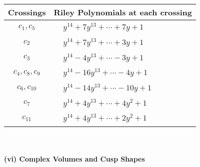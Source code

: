 \documentclass[1p]{elsarticle_modified}
\theoremstyle{definition}
\begin{document}
\begin{tabular}{m{50pt}|m{274pt}}
Crossings & \hspace{64pt}Riley Polynomials at each crossing \\
\hline $$\begin{aligned}c_{1},c_{5}\end{aligned}$$&$\begin{aligned}
&y^{14}+7 y^{13}+\cdots+7 y+1
\end{aligned}$\\
\hline $$\begin{aligned}c_{2}\end{aligned}$$&$\begin{aligned}
&y^{14}+7 y^{13}+\cdots+3 y+1
\end{aligned}$\\
\hline $$\begin{aligned}c_{3}\end{aligned}$$&$\begin{aligned}
&y^{14}-4 y^{13}+\cdots-3 y+1
\end{aligned}$\\
\hline $$\begin{aligned}c_{4},c_{8},c_{9}\end{aligned}$$&$\begin{aligned}
&y^{14}-16 y^{13}+\cdots-4 y+1
\end{aligned}$\\
\hline $$\begin{aligned}c_{6},c_{10}\end{aligned}$$&$\begin{aligned}
&y^{14}-14 y^{13}+\cdots-10 y+1
\end{aligned}$\\
\hline $$\begin{aligned}c_{7}\end{aligned}$$&$\begin{aligned}
&y^{14}+4 y^{13}+\cdots+4 y^2+1
\end{aligned}$\\
\hline $$\begin{aligned}c_{11}\end{aligned}$$&$\begin{aligned}
&y^{14}+4 y^{13}+\cdots+2 y^2+1
\end{aligned}$\\
\hline
\end{tabular}\\~\\
\newpage\flushleft \textbf{(vi) Complex Volumes and Cusp Shapes}
\end{document}
